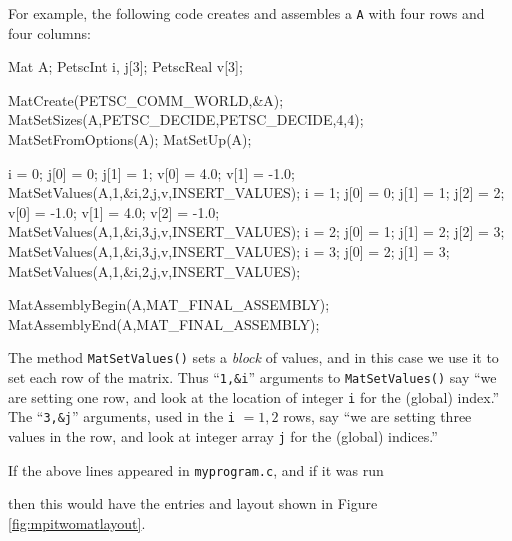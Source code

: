 For example, the following code creates and assembles a \pMat \texttt{A} with four rows and four columns:
\begin{code}
Mat A;
PetscInt  i, j[3];
PetscReal v[3];

MatCreate(PETSC_COMM_WORLD,&A);
MatSetSizes(A,PETSC_DECIDE,PETSC_DECIDE,4,4);
MatSetFromOptions(A);
MatSetUp(A);

i = 0;
j[0] = 0;    j[1] = 1;
v[0] = 4.0;  v[1] = -1.0;
MatSetValues(A,1,&i,2,j,v,INSERT_VALUES);
i = 1;
j[0] = 0;    j[1] = 1;    j[2] = 2;
v[0] = -1.0; v[1] = 4.0;  v[2] = -1.0;
MatSetValues(A,1,&i,3,j,v,INSERT_VALUES);
i = 2;
j[0] = 1;    j[1] = 2;    j[2] = 3;
MatSetValues(A,1,&i,3,j,v,INSERT_VALUES);
i = 3;
j[0] = 2;    j[1] = 3;
MatSetValues(A,1,&i,2,j,v,INSERT_VALUES);

MatAssemblyBegin(A,MAT_FINAL_ASSEMBLY);
MatAssemblyEnd(A,MAT_FINAL_ASSEMBLY);
\end{code}
The method \texttt{MatSetValues()} sets a \emph{block} of values, and in this case we use it to set each row of the matrix.  Thus ``\texttt{1,\&i}'' arguments to \texttt{MatSetValues()} say ``we are setting one row, and look at the location of integer \texttt{i} for the (global) index.''  The ``\texttt{3,\&j}'' arguments, used in the \texttt{i} $=1,2$ rows, say ``we are setting three values in the row, and look at integer array \texttt{j} for the (global) indices.''

If the above lines appeared in \texttt{myprogram.c}, and if it was run
then this \pMat would have the entries and layout shown in Figure \ref{fig:mpitwomatlayout}.

